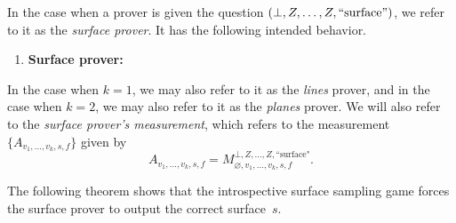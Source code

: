\documentclass[11pt]{article}
\newcommand{\ktimes}[2]{\underbrace{#1, \dots, #1}_{#2}}
\begin{document}
\begin{notation}
In the case when a prover is given the question $(\bot, Z, \ldots, Z, \mathrm{``surface"})$,
we refer to it as the \emph{surface prover}.  
It has the following intended behavior.
\begin{enumerate}
\item \textbf{Surface prover:}  
\end{enumerate}
In the case when $k = 1$, we may also refer to it as the \emph{lines} prover,
and in the case when $k = 2$, we may also refer to it as the \emph{planes} prover.
We will also refer to the \emph{surface prover's measurement},
which refers to the measurement $\{A_{v_1, \ldots, v_k, s, f}\}$ given by
\[A_{v_1, \ldots, v_k, s, f} = M^{\bot, Z, \dots, Z,
    \text{``surface"}}_{\varnothing, v_1, \dots, v_k, s,
    f}.\]
\end{notation}

The following theorem shows that the introspective surface sampling game
forces the surface prover to output the correct surface~$s$. 
\end{document}
